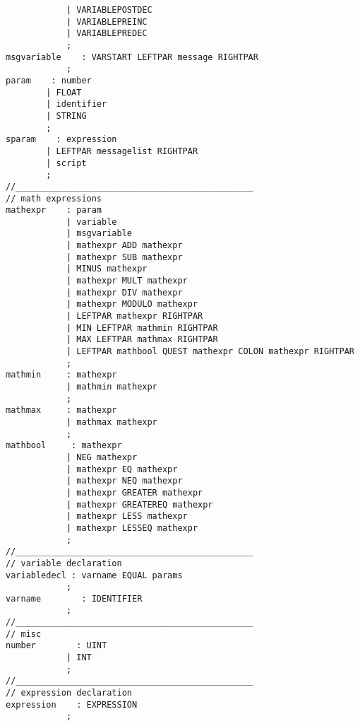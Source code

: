 \begin{verbatim}
            | VARIABLEPOSTDEC        
            | VARIABLEPREINC        
            | VARIABLEPREDEC        
            ;
msgvariable    : VARSTART LEFTPAR message RIGHTPAR 
            ;
param    : number                
        | FLOAT                    
        | identifier            
        | STRING                
        ;
sparam    : expression            
        | LEFTPAR messagelist RIGHTPAR    
        | script            
        ;
//_______________________________________________
// math expressions
mathexpr    : param                            
            | variable                        
            | msgvariable                    
            | mathexpr ADD mathexpr            
            | mathexpr SUB mathexpr            
            | MINUS mathexpr                
            | mathexpr MULT mathexpr        
            | mathexpr DIV mathexpr            
            | mathexpr MODULO mathexpr        
            | LEFTPAR mathexpr RIGHTPAR     
            | MIN LEFTPAR mathmin RIGHTPAR    
            | MAX LEFTPAR mathmax RIGHTPAR    
            | LEFTPAR mathbool QUEST mathexpr COLON mathexpr RIGHTPAR 
            ;
mathmin     : mathexpr                        
            | mathmin mathexpr                
            ;
mathmax     : mathexpr                        
            | mathmax mathexpr                
            ;
mathbool     : mathexpr                        
            | NEG mathexpr                    
            | mathexpr EQ mathexpr             
            | mathexpr NEQ mathexpr         
            | mathexpr GREATER mathexpr     
            | mathexpr GREATEREQ mathexpr     
            | mathexpr LESS mathexpr         
            | mathexpr LESSEQ mathexpr         
            ;
//_______________________________________________
// variable declaration
variabledecl : varname EQUAL params    
            ;
varname        : IDENTIFIER            
            ;
//_______________________________________________
// misc
number        : UINT                    
            | INT                    
            ;
//_______________________________________________
// expression declaration
expression    : EXPRESSION    
            ;
\end{verbatim}
